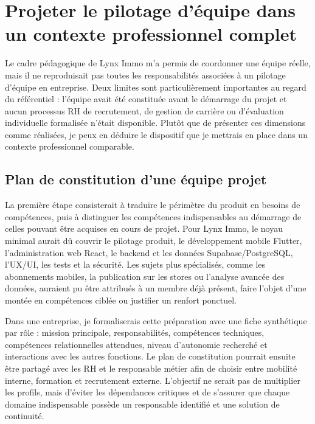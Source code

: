 \section{Projeter le pilotage d'équipe dans un contexte professionnel complet}

Le cadre pédagogique de Lynx Immo m'a permis de coordonner une équipe réelle, mais il ne reproduisait pas toutes les responsabilités associées à un pilotage d'équipe en entreprise. Deux limites sont particulièrement importantes au regard du référentiel : l'équipe avait été constituée avant le démarrage du projet et aucun processus RH de recrutement, de gestion de carrière ou d'évaluation individuelle formalisée n'était disponible. Plutôt que de présenter ces dimensions comme réalisées, je peux en déduire le dispositif que je mettrais en place dans un contexte professionnel comparable.

\subsection{Plan de constitution d'une équipe projet}

La première étape consisterait à traduire le périmètre du produit en besoins de compétences, puis à distinguer les compétences indispensables au démarrage de celles pouvant être acquises en cours de projet. Pour Lynx Immo, le noyau minimal aurait dû couvrir le pilotage produit, le développement mobile Flutter, l'administration web React, le backend et les données Supabase/PostgreSQL, l'UX/UI, les tests et la sécurité. Les sujets plus spécialisés, comme les abonnements mobiles, la publication sur les stores ou l'analyse avancée des données, auraient pu être attribués à un membre déjà présent, faire l'objet d'une montée en compétences ciblée ou justifier un renfort ponctuel.

Dans une entreprise, je formaliserais cette préparation avec une fiche synthétique par rôle : mission principale, responsabilités, compétences techniques, compétences relationnelles attendues, niveau d'autonomie recherché et interactions avec les autres fonctions. Le plan de constitution pourrait ensuite être partagé avec les RH et le responsable métier afin de choisir entre mobilité interne, formation et recrutement externe. L'objectif ne serait pas de multiplier les profils, mais d'éviter les dépendances critiques et de s'assurer que chaque domaine indispensable possède un responsable identifié et une solution de continuité.

